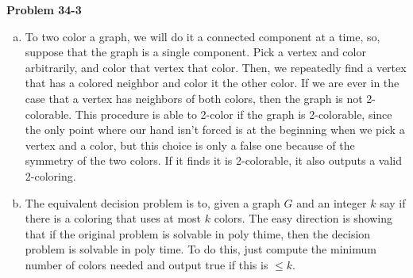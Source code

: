 \documentclass{article}
\begin{document}
\noindent\textbf{Problem 34-3}\\
\begin{enumerate}[a)]
\item To two color a graph, we will do it a connected component at a time, so, suppose that the graph is a single component. Pick a vertex and color arbitrarily, and color that vertex that color. Then, we repeatedly find a vertex that has a colored neighbor and color it the other color. If we are ever in the case that a vertex has neighbors of both colors, then the graph is not 2-colorable. This procedure is able to 2-color if the graph is 2-colorable, since the only point where our hand isn't forced is at the beginning when we pick a vertex and a color, but this choice is only a false one because of the symmetry of the two colors. If it finds it is 2-colorable, it also outputs a valid 2-coloring.
\item
The equivalent decision problem is to, given a graph $G$ and an integer $k$ say if there is a coloring that uses at most $k$ colors. The easy direction is showing that if the original problem is solvable in poly thime, then the decision problem is solvable in poly time. To do this, just compute the minimum number of colors needed and output true if this is $\le k$. 


\end{enumerate}
\end{document}
